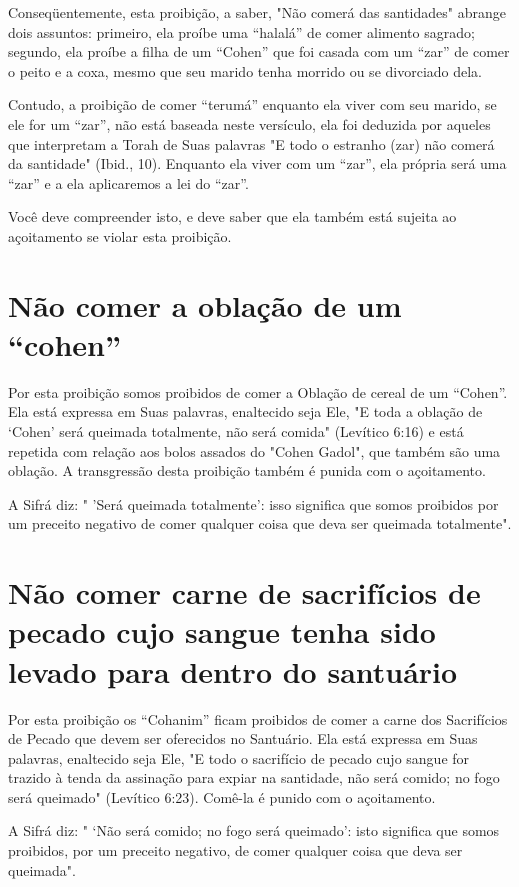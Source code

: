 Conseqüentemente, esta proibição, a saber, "Não comerá das santi­dades"
abrange dois assuntos: primeiro, ela proíbe uma ``halalá'' de comer
ali­mento sagrado; segundo, ela proíbe a filha de um ``Cohen'' que foi
casada com um ``zar'' de comer o peito e a coxa, mesmo que seu marido
tenha morrido ou se divorciado dela.

Contudo, a proibição de comer ``terumá'' enquanto ela viver com seu
marido, se ele for um ``zar'', não está baseada neste versículo, ela foi
dedu­zida por aqueles que interpretam a Torah de Suas palavras "E todo o
estranho (zar) não comerá da santidade" (Ibid., 10). Enquanto ela viver
com um ``zar'', ela própria será uma ``zar'' e a ela aplicaremos a lei do
``zar''.

Você deve compreender isto, e deve saber que ela também está su­jeita ao
açoitamento se violar esta proibição.

\section{Não comer a oblação de um ``cohen''}

Por esta proibição somos proibidos de comer a Oblação de cereal de um
``Cohen''. Ela está expressa em Suas palavras, enaltecido seja Ele, "E
to­da a oblação de `Cohen' será queimada totalmente, não será comida"
(Levítico 6:16) e está repetida com relação aos bolos assados do "Cohen
Gadol", que também são uma oblação. A transgressão desta proibição
também é punida com o açoitamento.

A Sifrá diz: " 'Será queimada totalmente': isso significa que somos
proibidos por um preceito negativo de comer qualquer coisa que deva ser
quei­mada totalmente".

\section{Não comer carne de sacrifícios de pecado cujo sangue tenha sido
levado para dentro do santuário}

Por esta proibição os ``Cohanim'' ficam proibidos de comer a carne dos
Sacrifícios de Pecado que devem ser oferecidos no Santuário. Ela está
ex­pressa em Suas palavras, enaltecido seja Ele, "E todo o sacrifício de
pecado cu­jo sangue for trazido à tenda da assinação para expiar na
santidade, não será comido; no fogo será queimado" (Levítico 6:23).
Comê-la é punido com o açoitamento.

A Sifrá diz: " `Não será comido; no fogo será queimado': isto signifi­ca
que somos proibidos, por um preceito negativo, de comer qualquer coisa
que deva ser queimada".

